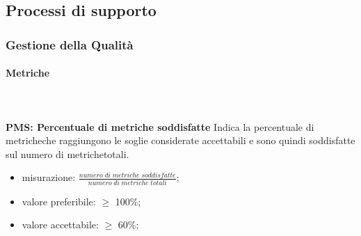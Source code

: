 											
			
	\subsection{Processi di supporto}		
		\subsubsection{Gestione della Qualità}
			\paragraph{Metriche} \mbox{} \\ \\
				\textbf{PMS: Percentuale di metriche soddisfatte} Indica la percentuale di metriche\glosp che raggiungono le soglie considerate accettabili e sono quindi soddisfatte sul numero di metriche\glosp totali.
				\begin{itemize}
					\item misurazione: $\frac{numero \; di \; metriche \; soddisfatte}{numero \; di \; metriche \; totali}$;
					\item valore preferibile: $\ge$ 100\%;
					\item valore accettabile: $\ge$ 60\%;
				\end{itemize}


		  
			
				

